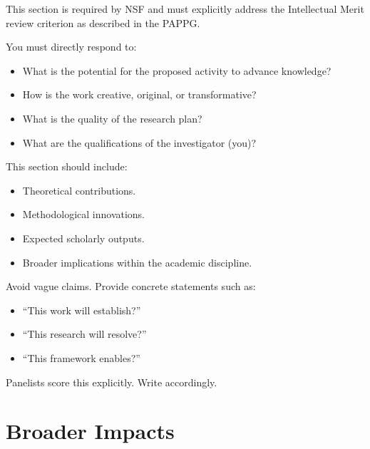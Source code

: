 \documentclass[11pt,letterpaper]{article}
\begin{document}
{This section is required by NSF and must explicitly address the Intellectual Merit review criterion as described in the PAPPG.

You must directly respond to:
\begin{itemize}
    \item What is the potential for the proposed activity to advance knowledge?
    \item How is the work creative, original, or transformative?
    \item What is the quality of the research plan?
    \item What are the qualifications of the investigator (you)?
\end{itemize}
This section should include:
\begin{itemize}
    \item Theoretical contributions.
    \item Methodological innovations.
    \item Expected scholarly outputs.
    \item Broader implications within the academic discipline.
\end{itemize}
Avoid vague claims. Provide concrete statements such as:
\begin{itemize}
    \item ``This work will establish?''
    \item ``This research will resolve?''
    \item ``This framework enables?''
\end{itemize}
Panelists score this explicitly. Write accordingly.

\section{Broader Impacts}

}
\end{document}

